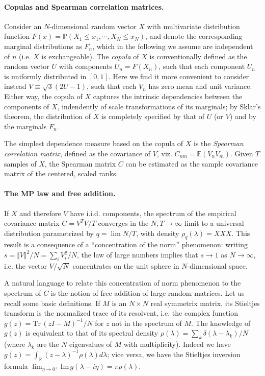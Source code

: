 \documentclass[
 prl,
 twocolumn,
 amsmath,
 amssymb,
 aps,
]{revtex4-2}
\begin{document}
\paragraph*{Copulas and Spearman correlation matrices.}
Consider an $N$-dimensional random vector $X$ with multivariate distribution function $F(x) = \mathbb{P}(X_1 \leq x_1, \cdots, X_N \leq x_N)$, and denote the corresponding marginal distributions as $F_n$, which in the following we assume are independent of $n$ (i.e. $X$ is exchangeable). 
The \emph{copula} of $X$ is conventionally defined as the random vector $U$ with components $U_n = F(X_n)$, such that each component $U_n$ is uniformly distributed in $[0, 1]$. 
Here we find it more convenient to consider instead $V \equiv \sqrt{3}(2U - 1)$, such that each $V_n$ has zero mean and unit variance. 
Either way, the copula of $X$ captures the intrinsic dependencies between the components of $X$, indendently of scale transformations of its marginals; by Sklar's theorem, the distribution of $X$ is completely specified by that of $U$ (or $V$) and by the marginals $F_n$. 

The simplest dependence measure based on the copula of $X$ is the \emph{Spearman correlation matrix}, defined as the covariance of $V$, viz. $C_{nm} = \mathbb{E}(V_nV_m)$.
Given $T$ samples of $X$, the Spearman matrix $C$ can be estimated as the sample covariance matrix of the centered, scaled ranks. 

\paragraph*{The MP law and free addition.}
If $X$ and therefore $V$ have i.i.d. components, the spectrum of the empirical covariance matrix $C = V^TV/T$ converges in the $N, T\to\infty$ limit to a universal distribution parametrized by $q = \lim N/T$, with density $\rho_q(\lambda) = XXX$. 
This result is a consequence of a ``concentration of the norm'' phenomenon: writing $s = \Vert V\Vert^2/N  = \sum_i V_i^2/N$, the law of large numbers implies that $s\to1$ as $N\to\infty$, i.e. the vector $V/\sqrt{N}$ concentrates on the unit sphere in $N$-dimensional space. 

A natural language to relate this concentration of norm phenomenon to the spectrum of $C$ is the notion of free addition of large random matrices.
Let us recall some basic definitions.
If $M$ is an $N\times N$ real symmetrix matrix, its Stieltjes transform is the normalized trace of its resolvent, i.e. the complex function $g(z) = \textrm{Tr}\,(z I - M)^{-1} / N$ for $z$ not in the spectrum of $M$.
The knowledge of $g(z)$ is equivalent to that of its spectral density $\rho(\lambda) = \sum_k\delta(\lambda - \lambda_k)/N$ (where $\lambda_k$ are the $N$ eigenvalues of $M$ with multiplicity).
Indeed we have $g(z) = \int_\mathbb{R} (z-\lambda)^{-1}\rho(\lambda)d\lambda$; vice versa, we have the Stieltjes inversion formula $\lim_{\eta\to 0^+}\textrm{Im}\, g(\lambda - i\eta) = \pi \rho(\lambda)$.
\end{document}
